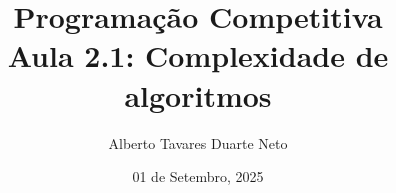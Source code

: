 \documentclass{beamer}
\title{{\Large Programação Competitiva}\\ Aula 2.1: Complexidade de algoritmos}
\date{01 de Setembro, 2025}
\author{Alberto Tavares Duarte Neto}
\institute{Universidade de Brasília}
\numberwithin{equation}{subsection}
\begin{document}
    \maketitle
    \small

    
    
    
    
    
    
    
    
    
    
\end{document}
